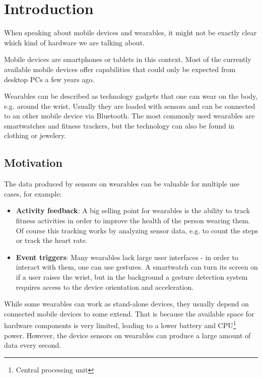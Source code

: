 \section{Introduction}
\label{sec:intro}

When speaking about mobile devices and wearables, it might not be exactly clear which kind of hardware we are talking about.

Mobile devices are smartphones or tablets in this context. Most of the currently available mobile devices offer capabilities that could only be expected from desktop PCs a few years ago.

Wearables can be described as technology gadgets that one can wear on the body, e.g. around the wrist.
Usually they are loaded with sensors and can be connected to an other mobile device via Bluetooth.
The most commonly used wearables are smartwatches and fitness trackers, but the technology can also be found in clothing or jewelery.

\subsection{Motivation}
\label{sec:intro:motivation}

The data produced by sensors on wearables can be valuable for multiple use cases, for example:
\begin{itemize}[noitemsep]
	\item \textbf{Activity feedback}:
	A big selling point for wearables is the ability to track fitness activities in order to improve the health of the person wearing them.
	Of course this tracking works by analyzing sensor data, e.g. to count the steps or track the heart rate.
	\item \textbf{Event triggers}:
	Many wearables lack large user interfaces - in order to interact with them, one can use gestures.
	A smartwatch can turn its screen on if a user raises the wrist, but in the background a gesture detection system requires access to the device orientation and acceleration.
\end{itemize}

While some wearables can work as stand-alone devices, they usually depend on connected mobile devices to some extend.
That is because the available space for hardware components is very limited, leading to a lower battery and CPU\footnote{Central processing unit} power.
However, the device sensors on wearables can produce a large amount of data every second.

\clearpage

